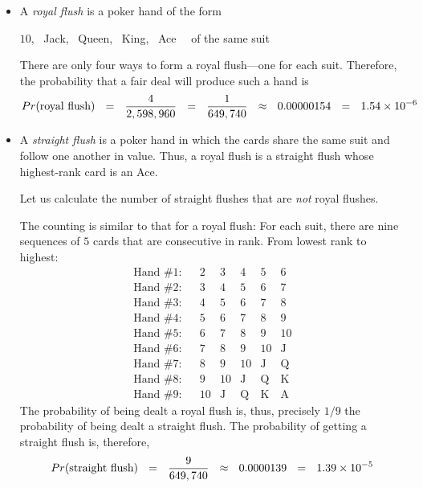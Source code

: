  
\begin{itemize}
\item
A {\it royal flush} is a poker hand of the form

\smallskip

\hspace*{.25in}$10$, \ {\sc Jack}, \ {\sc Queen}, \ {\sc King}, \ {\sc Ace} \ \ of the same suit

\smallskip

\noindent
There are only four ways to form a royal flush---one for each suit.  Therefore, the probability that
a fair deal will produce such a hand is
\[ 
Pr(\mbox{royal flush}) \ \ = \ \
\frac{4}{2,598,960} \ \ = \ \ {1 \over {649,740}} \ \ \approx \ \ 0.00000154 \ \ = \ \ 1.54 \times 10^{-6} \]

\medskip\item
A {\it straight flush} is a poker hand in which the cards share the same suit and follow one 
another in value.  Thus, a royal flush is a straight flush whose highest-rank card is an {\sc Ace}.

\medskip

Let us calculate the number of straight flushes that are {\em not} royal flushes.

\smallskip

The counting is similar to that for a royal flush:  For each suit, there are nine sequences of $5$ cards that are consecutive in rank.  From lowest rank to highest:
\[ \begin{array}{llccccc}
\mbox{Hand \#1}: & &
2 & 3 & 4 & 5 & 6 \\
\mbox{Hand \#2}: & &
3 & 4 & 5 & 6 & 7 \\
\mbox{Hand \#3}: & &
4 & 5 & 6 & 7 & 8 \\
\mbox{Hand \#4}: & &
5 & 6 & 7 & 8 & 9 \\
\mbox{Hand \#5}: & &
6 & 7 & 8 & 9 & 10 \\
\mbox{Hand \#6}: & &
7 & 8 & 9 & 10 &  \mbox{J} \\
\mbox{Hand \#7}: & &
8 & 9 & 10 &  \mbox{J} &   \mbox{Q} \\
\mbox{Hand \#8}: & &
9 & 10 &  \mbox{J} & \mbox{Q} &  \mbox{K}  \\
\mbox{Hand \#9}: & &
10 &  \mbox{J}
     & \mbox{Q}
     & \mbox{K}
     & \mbox{A}
\end{array} \]
The probability of being dealt a royal flush is, thus, precisely $1/9$ the probability of being dealt a straight flush.  The probability of getting a straight flush is, therefore,
\[  Pr(\mbox{straight flush}) \ \ = \ \
{9 \over {649,740}} \ \ \approx \ \ 0.0000139  \ \ = \ \ 1.39 \times 10^{-5} \]


\end{itemize}
